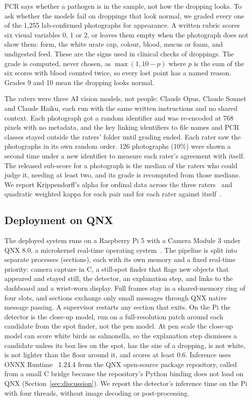 \documentclass[10pt,twocolumn]{article}
\begin{document}
PCR says whether a pathogen is in the sample, not how the dropping looks. To ask whether the models fail on
droppings that look normal, we graded every one of the 1,255 lab-confirmed photographs for appearance. A written
rubric scores six visual variables 0, 1 or 2, or leaves them empty when the photograph does not show them: form,
the white urate cap, colour, blood, mucus or foam, and undigested feed. These are the signs used in clinical checks
of droppings. The grade is computed, never chosen, as $\max(1, 10 - p)$ where $p$ is the sum of the six scores with
blood counted twice, so every lost point has a named reason. Grades 9 and 10 mean the dropping looks normal.

The raters were three AI vision models, not people: Claude Opus, Claude Sonnet and Claude Haiku, each run with
the same written instructions and no shared context. Each photograph got a random identifier and was re-encoded
at 768 pixels with no metadata, and the key linking identifiers to file names and PCR classes stayed outside the
raters' folder until grading ended. Each rater saw the photographs in its own random order. 126 photographs (10\%)
were shown a second time under a new identifier to measure each rater's agreement with itself. The released
sub-score for a photograph is the median of the raters who could judge it, needing at least two, and its grade is
recomputed from those medians. We report Krippendorff's alpha for ordinal data across the three
raters~\cite{hayes2007} and quadratic weighted kappa for each pair and for each rater against itself~\cite{cohen1968}.

\subsection{Deployment on QNX}
\label{sec:qnx}

The deployed system runs on a Raspberry Pi 5 with a Camera Module 3 under QNX 8.0, a microkernel real-time operating
system~\cite{qnx8sysarch}. The pipeline is split into separate processes (sections), each with its own memory and a
fixed real-time priority: camera capture in C, a still-spot finder that flags new objects that appeared and stayed
still, the detector, an explanation step, and links to the dashboard and a wrist-worn display. Full frames stay in a
shared-memory ring of four slots, and sections exchange only small messages through QNX native message passing. A
supervisor restarts any section that exits. On the Pi the detector is the close-up model, run on a full-resolution
patch around each candidate from the spot finder, not the pen model. At pen scale the close-up model can score white
birds as salmonella, so the explanation step dismisses a candidate unless its box lies on the spot, has the size of a
dropping, is not white, is not lighter than the floor around it, and scores at least 0.6. Inference uses ONNX Runtime~\cite{onnxruntime} 1.24.4 from the QNX
open-source package repository, called from a small C bridge because the repository's Python binding does not load on
QNX (Section~\ref{sec:discussion}). We report the detector's inference time on the Pi with four threads, without image
decoding or post-processing.
\end{document}
